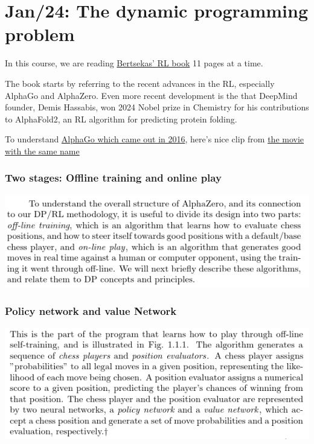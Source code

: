 \chapter{Jan/24: The dynamic programming problem}
In this course, we are reading
\href{https://web.mit.edu/dimitrib/www/RLCOURSECOMPLETE.pdf}{Bertsekas'
RL book} 11 pages at a time.

The book starts by referring to the recent advances in the RL,
especially AlphaGo and AlphaZero. Even more recent development is the
that DeepMind founder, Demis Hassabis, won 2024 Nobel prize in Chemistry
for his contributions to AlphaFold2, an RL algorithm for predicting
protein folding.

To understand \href{https://www.nature.com/articles/nature16961}{AlphaGo
which came out in 2016}, here's nice clip from
\href{https://www.youtube.com/watch?v=WXuK6gekU1Y&start=2831}{the movie with the
same name}

\hypertarget{two-stages-offline-training-and-online-play}{%
\subsection{Two stages: Offline training and online
play}\label{two-stages-offline-training-and-online-play}}

\includegraphics[width=\linewidth]{assets/2025-01-23-offline-online.png}

\hypertarget{policy-network-and-value-network}{%
\subsection{Policy network and value
Network}\label{policy-network-and-value-network}}

\includegraphics[width=\linewidth]{assets/2025-01-23-two.png}

